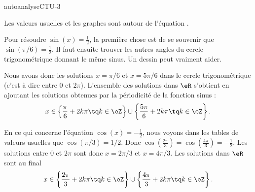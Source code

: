 
\begin{corrige}{autoanalyseCTU-3}

    \begin{wrapfigure}{r}{5.0cm}
   \vspace{-0.5cm}        %
   \centering
   
\end{wrapfigure}

Les valeurs usuelles et les graphes sont autour de l'équation \pageref{PGooIMQFooTnBdIl}.

Pour résoudre \( \sin(x)=\frac{ 1 }{2}\), la première chose est de se souvenir que \( \sin(\pi/6)=\frac{ 1 }{2}\). Il faut ensuite trouver les autres angles du cercle trigonométrique donnant le même sinus. Un dessin peut vraiment aider.

Nous avons donc les solutions \( x=\pi/6\) et \( x=5\pi/6\) dans le cercle trigonométrique (c'est à dire entre \( 0\) et \( 2\pi\)). L'ensemble des solutions dans \( \eR\) s'obtient en ajoutant les solutions obtenues par la périodicité de la fonction sinus :
\begin{equation}
    x\in\left\{ \frac{ \pi }{ 6 }+2k\pi\tq k\in \eZ \right\}\cup\left\{ \frac{ 5\pi }{ 6 }+2k\pi\tq k\in \eZ \right\}.
\end{equation}

En ce qui concerne l'équation \( \cos(x)=-\frac{ 1 }{2}\), nous voyons dans les tables de valeurs usuelles que \( \cos(\pi/3)=1/2\). Donc \( \cos(\frac{ 2\pi }{ 3 })=\cos(\frac{ 4\pi }{ 3 })=-\frac{ 1 }{2}\). Les solutions entre \( 0\) et \( 2\pi\) sont donc \( x=2\pi/3\) et \( x=4\pi/3\). Les solutions dans \( \eR\) sont au final
\begin{equation}
    x\in\left\{ \frac{ 2\pi }{ 3 }+2k\pi\tq k\in \eZ \right\}\cup\left\{ \frac{ 4\pi }{ 3 }+2k\pi\tq k\in \eZ \right\}.
\end{equation}

\end{corrige}   

